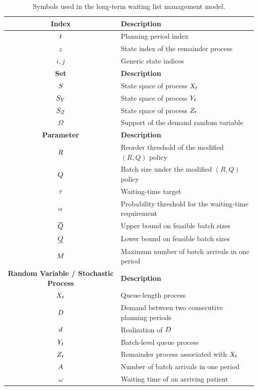 \begin{table}[htb]
    \centering
    \caption{Symbols used in the long-term waiting list management model.\label{tab:symb_rq}}
    \scriptsize
    \begin{tabular}{cl}
    \toprule
    \textbf{Index} & \textbf{Description} \\
    \midrule
    $t$ & Planning period index \\
    $z$ & State index of the remainder process \\
    $i,j$ & Generic state indices \\
    \midrule

    \textbf{Set} & \textbf{Description} \\
    \midrule
    $S$ & State space of process $X_{t}$ \\
    $S_{Y_{}}$ & State space of process $Y_{t}$ \\
    $S_{Z_{}}$ & State space of process $Z_{t}$ \\
    $\Omega$ & Support of the demand random variable \\
    \midrule

    \textbf{Parameter} & \textbf{Description} \\
    \midrule
    $R$ & Reorder threshold of the modified $(R,Q)$ policy \\
    $Q$ & Batch size under the modified $(R,Q)$ policy \\
    $\tau$ & Waiting-time target \\
    $\alpha$ & Probability threshold for the waiting-time requirement \\
    $\overline{Q}$ & Upper bound on feasible batch sizes \\
    $\underline{Q}$ & Lower bound on feasible batch sizes \\
    $M$ & Maximum number of batch arrivals in one period \\
    \midrule

    \textbf{Random Variable / Stochastic Process} & \textbf{Description} \\
    \midrule
    $X_{t}$ & Queue-length process \\
    $D$ & Demand between two consecutive planning periods \\
    $d$ & Realisation of $D$ \\
    $Y_{t}$ & Batch-level queue process \\
    $Z_{t}$ & Remainder process associated with $X_{t}$ \\
    $A$ & Number of batch arrivals in one period \\
    $\omega$ & Waiting time of an arriving patient \\
    \midrule


\end{tabular}
\end{table}

